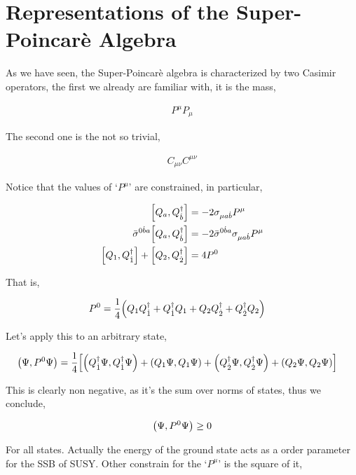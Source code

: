 \section{Representations of the Super-Poincarè Algebra}

As we have seen, the Super-Poincarè algebra is characterized by two Casimir operators, the first we already are familiar with, it is the mass,

\begin{align}
    P^\mu P_\mu\nonumber
\end{align}

The second one is the not so trivial,

\begin{align}
    C_{\mu\nu}C^{\mu\nu}\nonumber
\end{align}

Notice that the values of `$P^\mu$' are constrained, in particular,

\begin{align}
    \comm{Q_a}{Q^\dagger_{\dot b}}&=-2\sigma_{\mu a\dot b}P^\mu\nonumber\\
    \tensor{\bar\sigma}{^0^{\dot b}^a}\comm{Q_a}{Q^\dagger_{\dot b}}&=-2\tensor{\bar\sigma}{^0^{\dot b}^a}\sigma_{\mu a\dot b}P^\mu\nonumber\\
    \comm{Q_1}{Q^\dagger_{\dot 1}}+\comm{Q_2}{Q^\dagger_{\dot 2}}&=4P^0\nonumber
\end{align}

That is,

\begin{align}
    P^0&=\frac14\qty(Q_1Q^\dagger_{\dot 1}+Q^\dagger_{\dot 1}Q_1+Q_2Q^\dagger_{\dot 2}+Q^\dagger_{\dot 2}Q_2)\nonumber
\end{align}

Let's apply this to an arbitrary state,

\begin{align}
    \qty(\Psi,P^0\Psi)&=\frac14\qty[\qty(Q^\dagger_{\dot 1}\Psi,Q^\dagger_{\dot 1}\Psi)+\qty(Q_1\Psi,Q_1\Psi)+\qty(Q^\dagger_{\dot 2}\Psi,Q^\dagger_{\dot 2}\Psi)+\qty(Q_2\Psi,Q_2\Psi)]\nonumber
\end{align}

This is clearly non negative, as it's the sum over norms of states, thus we conclude,

\begin{align}
    \qty(\Psi,P^0\Psi)\geq 0\nonumber
\end{align}

For all states. Actually the energy of the ground state acts as a order parameter for the SSB of SUSY. Other constrain for the `$P^\mu$' is the square of it,

